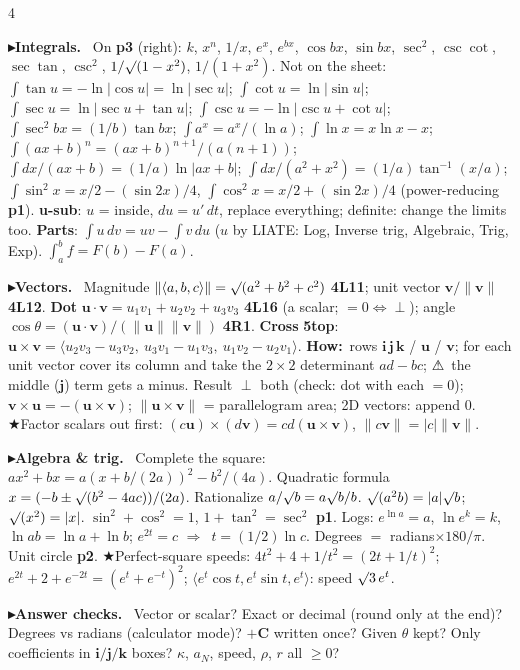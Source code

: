\documentclass{article}
\newcommand\stampheight{28pt}  %
\newcommand\vb[1]{\symbf{#1}}                 %
\newcommand\nm[1]{\lVert #1\rVert}            %
\newcommand\ip[1]{\langle #1\rangle}          %
\newcommand\sh[1]{{\setlength\fboxsep{0.18pt}\colorbox{black!22}{\textbf{#1}}}} %
\newcommand\pt[1]{\par\textbf{{\symf ▸}#1}\ }  %
\newcommand\how{\textbf{How:}\ }
\newcommand\warn{{\symf ⚠}}                    %
\newcommand\shc{{\symf ★}}                      %
\newcommand\rt{\smash{\surd}}               %
\newcommand\then{\ensuremath{\Rightarrow}}
\begin{document}
\begin{multicols*}{4}
\pt{Integrals.} On \sh{p3} (right): $k$, $x^n$, $1/x$, $e^x$, $e^{bx}$, $\cos bx$, $\sin bx$, $\sec^2$, $\csc\cot$, $\sec\tan$, $\csc^2$, $1/\rt(1-x^2)$, $1/(1+x^2)$. Not on the sheet: $\int\tan u=-\ln|\cos u|=\ln|\sec u|$; $\int\cot u=\ln|\sin u|$; $\int\sec u=\ln|\sec u+\tan u|$; $\int\csc u=-\ln|\csc u+\cot u|$; $\int\sec^2bx=(1/b)\tan bx$; $\int a^x=a^x/(\ln a)$; $\int\ln x=x\ln x-x$; $\int(ax+b)^n=(ax+b)^{n+1}/(a(n+1))$; $\int dx/(ax+b)=(1/a)\ln|ax+b|$; $\int dx/(a^2+x^2)=(1/a)\tan^{-1}(x/a)$; $\int\sin^2x=x/2-(\sin2x)/4$, $\int\cos^2x=x/2+(\sin2x)/4$ (power-reducing \sh{p1}). \textbf{u-sub}: $u$ = inside, $du=u'\,dt$, replace everything; definite: change the limits too. \textbf{Parts}: $\int u\,dv=uv-\int v\,du$ ($u$ by LIATE: Log, Inverse trig, Algebraic, Trig, Exp). $\int_a^bf=F(b)-F(a)$.

\pt{Vectors.} Magnitude $\nm{\ip{a,b,c}}=\rt(a^2+b^2+c^2)$ \sh{4L11}; unit vector $\vb v/\nm{\vb v}$ \sh{4L12}. \textbf{Dot} $\vb u\cdot\vb v=u_1v_1+u_2v_2+u_3v_3$ \sh{4L16} (a scalar; $=0\iff\perp$); angle $\cos\theta=(\vb u\cdot\vb v)/(\nm{\vb u}\nm{\vb v})$ \sh{4R1}. \textbf{Cross} \sh{5top}: $\vb u\times\vb v=\ip{u_2v_3-u_3v_2,\ u_3v_1-u_1v_3,\ u_1v_2-u_2v_1}$. \how rows $\vb i\,\vb j\,\vb k$ / $\vb u$ / $\vb v$; for each unit vector cover its column and take the $2\times2$ determinant $ad-bc$; \warn\ the middle ($\vb j$) term gets a minus. Result $\perp$ both (check: dot with each $=0$); $\vb v\times\vb u=-(\vb u\times\vb v)$; $\nm{\vb u\times\vb v}$ = parallelogram area; 2D vectors: append 0. \shc Factor scalars out first: $(c\vb u)\times(d\vb v)=cd(\vb u\times\vb v)$, $\nm{c\vb v}=|c|\nm{\vb v}$.

\pt{Algebra \& trig.} Complete the square: $ax^2+bx=a(x+b/(2a))^2-b^2/(4a)$. Quadratic formula $x=(-b\pm\rt(b^2-4ac))/(2a)$. Rationalize $a/\rt b=a\rt b/b$. $\rt(a^2b)=|a|\rt b$; $\rt(x^2)=|x|$. $\sin^2+\cos^2=1$, $1+\tan^2=\sec^2$ \sh{p1}. Logs: $e^{\ln a}=a$, $\ln e^k=k$, $\ln ab=\ln a+\ln b$; $e^{2t}=c$ \then\ $t=(1/2)\ln c$. Degrees $=$ radians$\times180/\pi$. Unit circle \sh{p2}. \shc Perfect-square speeds: $4t^2+4+1/t^2=(2t+1/t)^2$; $e^{2t}+2+e^{-2t}=(e^t+e^{-t})^2$; $\ip{e^t\cos t,e^t\sin t,e^t}$: speed $\rt3\,e^t$.

\pt{Answer checks.} Vector or scalar? Exact or decimal (round only at the end)? Degrees vs radians (calculator mode)? $+\vb C$ written once? Given $\theta$ kept? Only coefficients in $\vb i/\vb j/\vb k$ boxes? $\kappa$, $a_N$, speed, $\rho$, $r$ all $\ge0$?

\vfill
\noindent\hfil\resizebox{!}{\stampheight}{\vbox{\special{pdf:bc [1] [0]}\stampf\fontsize{20}{20}\selectfont
  \baselineskip=0pt \lineskiplimit=0pt \lineskip=2.6pt
  \halign{\hfil#\hfil\cr STAMP\cr HERE\cr}\special{pdf:ec}}}\hfil\par

\end{multicols*}
\end{document}
